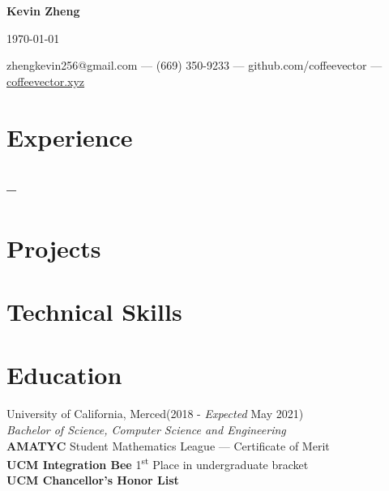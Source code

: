 \documentclass[letterpaper,12pt]{article}
\makeatletter
\newcommand\textbox[1]{%
    \parbox{.333\textwidth}{#1}%
}
\renewcommand{\maketitle}{
    \begin{center}
        \noindent\textbox{\hfill}\textbox{\hfil\bfseries\huge Kevin Zheng\hfil}\textbox{\hfill \today}
        {\faEnvelope \enskip zhengkevin256@gmail.com --- \faPhone \enskip (669) 350-9233 --- \faGithub \enskip github.com/coffeevector --- \faChain \enskip \underline{\color{blue}coffeevector.xyz}}
    \end{center} }
\makeatother
\begin{document}
\maketitle
\section{Experience}
    \subsection{ -- \null\hfill {}}
    \vspace*{-2mm}
\section{Projects}
    \subsection{\null\hfill {}}
    \vspace*{-2mm}
\section{Technical Skills}
    \subsection{}
    \vspace*{-4mm}
\section{Education}
University of California, Merced\null\hfill(2018 - \emph{Expected} May 2021)\\
           \emph{Bachelor of Science, Computer Science and Engineering}
    \\{\bfseries AMATYC} Student Mathematics League --- Certificate of Merit\\
    {\bfseries UCM Integration Bee} 1\textsuperscript{st} Place in undergraduate bracket\\
    {\bfseries UCM Chancellor's Honor List}
    \vspace*{-2mm}
%
\end{document}
